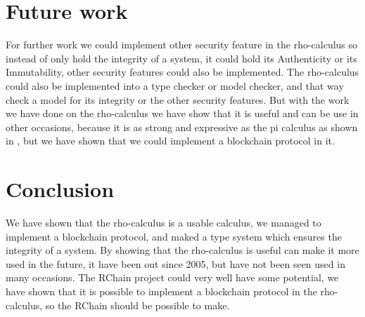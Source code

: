 \section{Future work}
For further work we could implement other security feature in the rho-calculus so instead of only hold the integrity of a system, it could hold its Authenticity or its Immutability, other security features could also be implemented. The rho-calculus could also be implemented into a type checker or model checker, and that way check a model for its integrity or the other security features. But with the work we have done on the rho-calculus we have show that it is useful and can be use in other occasions, because it is as strong and expressive as the pi calculus as shown in \citep{Meredith2005}, but we have shown that we could implement a blockchain protocol in it.



\section{Conclusion}
We have shown that the rho-calculus is a usable calculus, we managed to implement a blockchain protocol, and maked a type system which ensures the integrity of a system. By showing that the rho-calculus is useful can make it more used in the future, it have been out since 2005, but have not been seen used in many occasions. The RChain project could very well have some potential, we have shown that it is possible to implement a blockchain protocol in the rho-calculus, so the RChain should be possible to make.